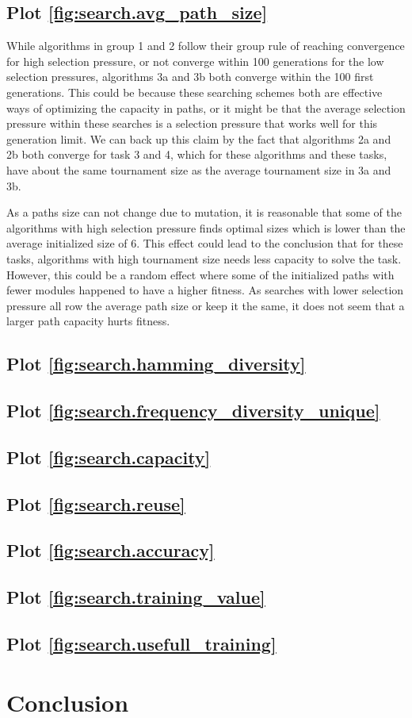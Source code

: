 \subsection{Plot \ref{fig:search.avg_path_size}}
While algorithms in group 1 and 2 follow their group rule of reaching convergence for high selection pressure, or not converge within 100 generations for the low selection pressures, algorithms 3a and 3b both converge within the 100 first generations. This could be because these searching schemes both are effective ways of optimizing the capacity in paths, or it might be that the average selection pressure within these searches is a selection pressure that works well for this generation limit. We can back up this claim by the fact that algorithms 2a and 2b both converge for task 3 and 4, which for these algorithms and these tasks, have about the same tournament size as the average tournament size in 3a and 3b. 

As a paths size can not change due to mutation, it is reasonable that some of the algorithms with high selection pressure finds optimal sizes which is lower than the average initialized size of 6. This effect could lead to the conclusion that for these tasks, algorithms with high tournament size needs less capacity to solve the task. However, this could be a random effect where some of the initialized paths with fewer modules happened to have a higher fitness. As searches with lower selection pressure all row the average path size or keep it the same, it does not seem that a larger path capacity hurts fitness.
\subsection{Plot \ref{fig:search.hamming_diversity}}
\subsection{Plot \ref{fig:search.frequency_diversity_unique}}
\subsection{Plot \ref{fig:search.capacity}}
\subsection{Plot \ref{fig:search.reuse}}
\subsection{Plot \ref{fig:search.accuracy}}
\subsection{Plot \ref{fig:search.training_value}}
\subsection{Plot \ref{fig:search.usefull_training}}

\section{Conclusion}